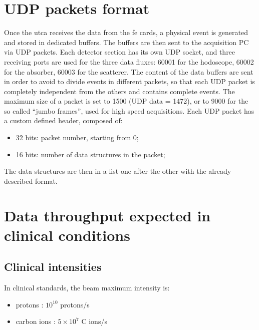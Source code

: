 \section{UDP packets format}\label{chapappA::sec::UDPpackForm}
Once the \gls{utca} receives the data from the \gls{fe} cards, a physical event is generated and stored in dedicated buffers. The buffers are then sent to the acquisition PC via UDP packets. Each detector section has its own UDP socket, and three receiving ports are used for the three data fluxes: 60001 for the hodoscope, 60002 for the absorber, 60003 for the scatterer. The content of the data buffers are sent in order to avoid to divide events in different packets, so that each UDP packet is completely independent from the others and contains complete events. The maximum size of a packet is set to 1500 (UDP data = 1472), or to 9000 for the so called \enquote{jumbo frames}, used for high speed acquisitions.\newline
Each UDP packet has a custom defined header, composed of:
\begin{itemize}
\item 32 bits: packet number, starting from 0;
\item 16 bits: number of data structures in the packet;
\end{itemize}
The data structures are then in a list one after the other with the already described format.

\section{Data throughput expected in clinical conditions}\label{chapappA::sec::dataThroughputClinic}
\subsection{Clinical intensities}\label{chapappA::subsec::clinIntensity}
In clinical standards, the beam maximum intensity is:
\begin{itemize}
	\item protons : $10^{10}$ protons/s
	\item carbon ions : $5\times10^7$ C ions/s\newline
\end {itemize}


